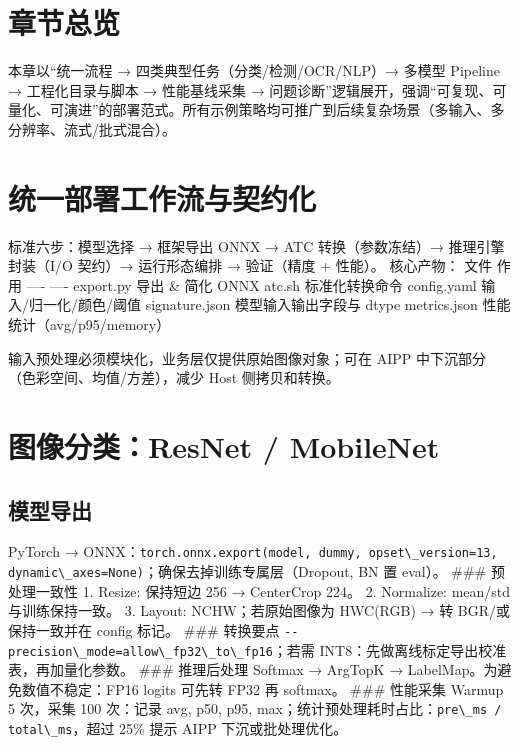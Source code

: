 \section{章节总览}\label{ux7ae0ux8282ux603bux89c8}

本章以``统一流程 → 四类典型任务（分类/检测/OCR/NLP）→ 多模型 Pipeline →
工程化目录与脚本 → 性能基线采集 →
问题诊断''逻辑展开，强调``可复现、可量化、可演进''的部署范式。所有示例策略均可推广到后续复杂场景（多输入、多分辨率、流式/批式混合）。

\section{统一部署工作流与契约化}\label{ux7edfux4e00ux90e8ux7f72ux5de5ux4f5cux6d41ux4e0eux5951ux7ea6ux5316}

标准六步：模型选择 → 框架导出 ONNX → ATC 转换（参数冻结）→
推理引擎封装（I/O 契约）→ 运行形态编排 → 验证（精度 + 性能）。
核心产物： \textbar{} 文件 \textbar{} 作用 \textbar{} \textbar{} ----
\textbar{} ---- \textbar{} \textbar{} export.py \textbar{} 导出 \& 简化
ONNX \textbar{} \textbar{} atc.sh \textbar{} 标准化转换命令 \textbar{}
\textbar{} config.yaml \textbar{} 输入/归一化/颜色/阈值 \textbar{}
\textbar{} signature.json \textbar{} 模型输入输出字段与 dtype \textbar{}
\textbar{} metrics.json \textbar{} 性能统计（avg/p95/memory） \textbar{}

输入预处理必须模块化，业务层仅提供原始图像对象；可在 AIPP
中下沉部分（色彩空间、均值/方差），减少 Host 侧拷贝和转换。

\section{图像分类：ResNet /
MobileNet}\label{ux56feux50cfux5206ux7c7bresnet-mobilenet}

\subsection{模型导出}\label{ux6a21ux578bux5bfcux51fa}

PyTorch →
ONNX：\passthrough{\lstinline!torch.onnx.export(model, dummy, opset\_version=13, dynamic\_axes=None)!}；确保去掉训练专属层（Dropout,
BN 置 eval）。 \#\#\# 预处理一致性 1. Resize: 保持短边 256 → CenterCrop
224。 2. Normalize: mean/std 与训练保持一致。 3. Layout:
NCHW；若原始图像为 HWC(RGB) → 转 BGR/或保持一致并在 config 标记。 \#\#\#
转换要点
\passthrough{\lstinline!--precision\_mode=allow\_fp32\_to\_fp16!}；若需
INT8：先做离线标定导出校准表，再加量化参数。 \#\#\# 推理后处理 Softmax →
ArgTopK → LabelMap。为避免数值不稳定：FP16 logits 可先转 FP32 再
softmax。 \#\#\# 性能采集 Warmup 5 次，采集 100 次：记录 avg, p50, p95,
max；统计预处理耗时占比：\passthrough{\lstinline!pre\_ms / total\_ms!}，超过
25\% 提示 AIPP 下沉或批处理优化。

